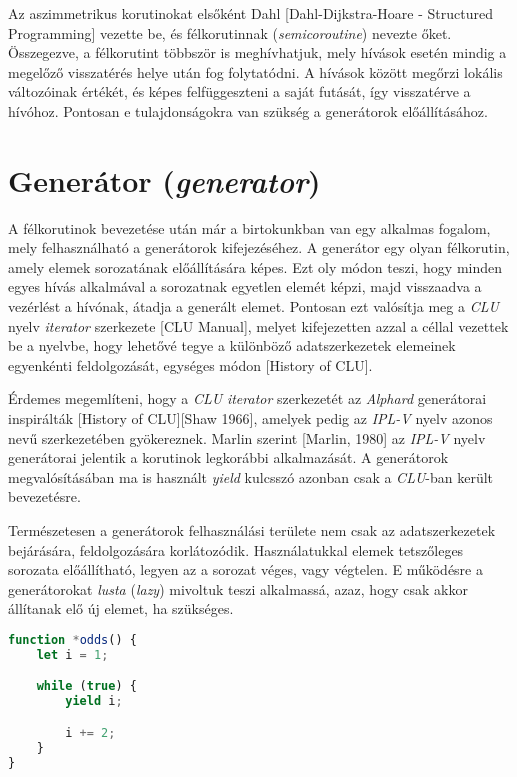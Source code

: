 Az aszimmetrikus korutinokat elsőként Dahl [Dahl-Dijkstra-Hoare - Structured Programming] vezette be, és félkorutinnak (\textit{semicoroutine}) nevezte őket. Összegezve, a félkorutint többször is meghívhatjuk, mely hívások esetén mindig a megelőző visszatérés helye után fog folytatódni. A hívások között megőrzi lokális változóinak értékét, és képes felfüggeszteni a saját futását, így visszatérve a hívóhoz. Pontosan e tulajdonságokra van szükség a generátorok előállításához.

\section{Generátor (\textit{generator})}

A félkorutinok bevezetése után már a birtokunkban van egy alkalmas fogalom, mely felhasználható a generátorok kifejezéséhez. A generátor egy olyan félkorutin, amely elemek sorozatának előállítására képes. Ezt oly módon teszi, hogy minden egyes hívás alkalmával a sorozatnak egyetlen elemét képzi, majd visszaadva a vezérlést a hívónak, átadja a generált elemet. Pontosan ezt valósítja meg a \textit{CLU} nyelv \textit{iterator} szerkezete [CLU Manual], melyet kifejezetten azzal a céllal vezettek be a nyelvbe, hogy lehetővé tegye a különböző adatszerkezetek elemeinek egyenkénti feldolgozását, egységes módon [History of CLU].

Érdemes megemlíteni, hogy a \textit{CLU} \textit{iterator} szerkezetét az \textit{Alphard} generátorai inspirálták [History of CLU][Shaw 1966], amelyek pedig az \textit{IPL-V} nyelv azonos nevű szerkezetében gyökereznek. Marlin szerint [Marlin, 1980] az \textit{IPL-V} nyelv generátorai jelentik a korutinok legkorábbi alkalmazását. A generátorok megvalósításában ma is használt \textit{yield} kulcsszó azonban csak a \textit{CLU}-ban került bevezetésre.

Természetesen a generátorok felhasználási területe nem csak az adatszerkezetek bejárására, feldolgozására korlátozódik. Használatukkal elemek tetszőleges sorozata előállítható, legyen az a sorozat véges, vagy végtelen. E működésre a generátorokat \textit{lusta} (\textit{lazy}) mivoltuk teszi alkalmassá, azaz, hogy csak akkor állítanak elő új elemet, ha szükséges.

\begin{lstlisting}[language=JavaScript, caption={Páratlan számok végtelen sorozatát előállító generátor JavaScriptben}, captionpos=b, label=JSGenOdds]
function *odds() {
    let i = 1;

    while (true) {
        yield i;

        i += 2;
    }
}
\end{lstlisting}

